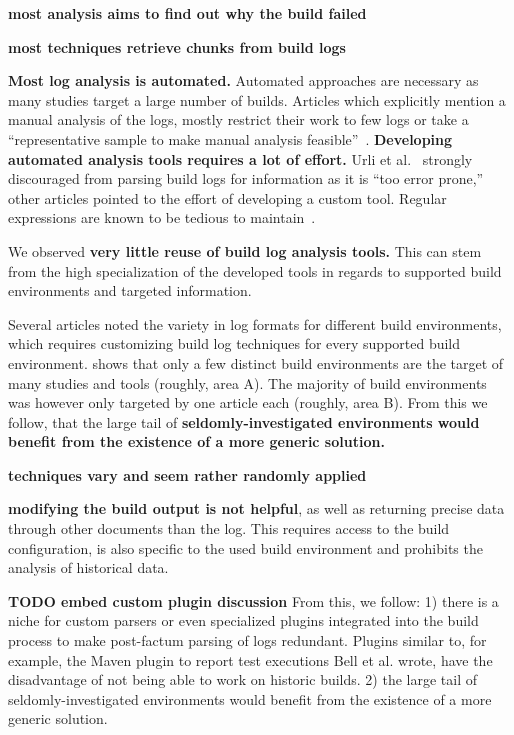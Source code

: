 \textbf{most analysis aims to find out why the build failed}

\textbf{most techniques retrieve chunks from build logs}

\textbf{Most log analysis is automated.} Automated approaches are
necessary as many studies target a large number of builds.
Articles
which explicitly mention a manual analysis of the logs, mostly
restrict their work to few logs or take a ``representative sample to
make manual analysis feasible''~\cite{zolfagharinia2017not}.
\textbf{Developing automated analysis tools requires a lot of effort.}
Urli et al.~\cite{urli2018design} strongly discouraged from parsing
build logs for information as it is ``too error prone,'' other
articles pointed to the effort of developing a custom tool.
Regular expressions are known to be tedious to
maintain~\cite{michael2019regexes}.

We observed \textbf{very little reuse of build log analysis tools.}
This can stem from the
high specialization of the developed tools in regards to supported
build environments and targeted information.

Several articles noted the variety in log formats for different build
environments, which requires customizing build log techniques for
every supported build environment.
 shows that only a few distinct
build environments are the target of
many studies and tools (roughly, area A).
The majority of build environments was however only targeted by one
article each (roughly, area B).
From this we follow, that the large tail of
\textbf{seldomly-investigated
environments would benefit from the
existence of a more generic solution.}

\textbf{techniques vary and seem rather randomly applied}

\textbf{modifying the build output is not helpful}, as well as returning
precise data through other documents than the log.
This requires access to the build configuration, is also specific to
the used build environment and prohibits the analysis of
historical data.

\textbf{TODO embed custom plugin discussion}
From this, we follow: 1) there is a niche for custom parsers or even
specialized plugins integrated into the build process to make
post-factum
parsing of logs redundant.
Plugins  similar to, for example, the Maven plugin to report test
executions Bell et al.
wrote, have the disadvantage of not being able to work on historic
builds.
2) the large tail of seldomly-investigated environments would benefit
from the existence of a more generic
solution.

